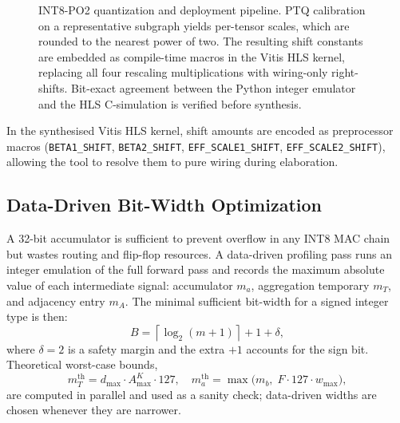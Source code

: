 \documentclass{IEEEtran}
\begin{document}
\begin{figure}[htbp]
    \centering
    \caption{INT8-PO2 quantization and deployment pipeline. PTQ calibration on a representative subgraph yields per-tensor scales, which are rounded to the nearest power of two. The resulting shift constants are embedded as compile-time macros in the Vitis HLS kernel, replacing all four rescaling multiplications with wiring-only right-shifts. Bit-exact agreement between the Python integer emulator and the HLS C-simulation is verified before synthesis.}
    \label{fig:po2_pipeline}
\end{figure}

In the synthesised Vitis HLS kernel, shift amounts are encoded as preprocessor macros (\texttt{BETA1\_SHIFT}, \texttt{BETA2\_SHIFT}, \texttt{EFF\_SCALE1\_SHIFT}, \texttt{EFF\_SCALE2\_SHIFT}), allowing the tool to resolve them to pure wiring during elaboration.

\subsection{Data-Driven Bit-Width Optimization}
\label{sec:bwopt}

A 32-bit accumulator is sufficient to prevent overflow in any INT8 MAC chain but wastes routing and flip-flop resources. A data-driven profiling pass runs an integer emulation of the full forward pass and records the maximum absolute value of each intermediate signal: accumulator $m_{a}$, aggregation temporary $m_T$, and adjacency entry $m_A$. The minimal sufficient bit-width for a signed integer type is then:
\begin{equation}
    B = \left\lceil\log_2(m+1)\right\rceil + 1 + \delta,
    \label{eq:bwidth}
\end{equation}
where $\delta=2$ is a safety margin and the extra $+1$ accounts for the sign bit. Theoretical worst-case bounds,
\begin{equation}
    m_T^{\mathrm{th}} = d_{\max}\cdot A^K_{\max}\cdot 127,\quad
    m_a^{\mathrm{th}} = \max\!\bigl(m_b,\; F\cdot 127\cdot w_{\max}\bigr),
    \label{eq:bwidth_theory}
\end{equation}
are computed in parallel and used as a sanity check; data-driven widths are chosen whenever they are narrower.
\end{document}
